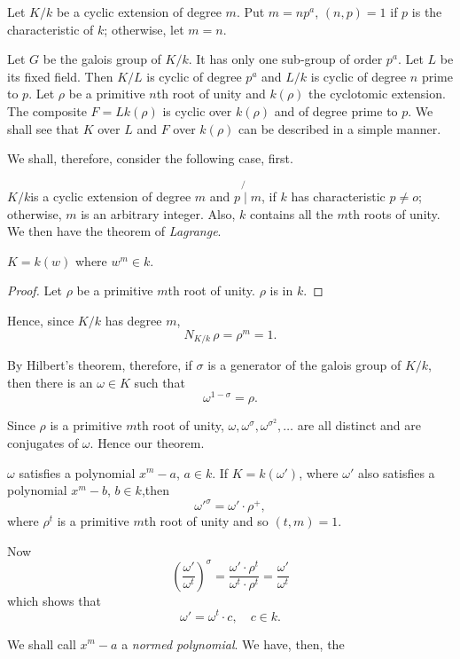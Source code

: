 Let $K/k$ be a cyclic extension of degree $m$. Put $m=n p^a$, $(n,p)=1$
if $p$ is the characteristic of $k$; otherwise, let $m=n$. 

Let $G$ be the galois group of $K/k$. It has only one sub-group of 
order $p^a$. Let $L$ be its fixed field. Then $K/L$ is cyclic of 
degree $p^a$ and $L/k$ is cyclic of degree $n$ prime to $p$. Let
$\rho$ be a primitive $n$th root of unity and $k(\rho)$ the cyclotomic
extension. The composite $F = Lk(\rho)$ is cyclic over $k(\rho)$ and
of degree prime to $p$. We shall see that $K$ over $L$ 
and $F$ over $k(\rho)$ can be described in a simple manner. 

We shall, therefore, consider the following case, first.

$K/k$\pageoriginale is a cyclic extension of degree $m$ and $p \not
{\mid}m$, if $k$ has characteristic $p \neq o$; otherwise, $m$ is an
arbitrary integer. Also, $k$ contains all the $m$th roots of unity. We
then have the theorem of \textit{Lagrange}.  

\begin{thm}\label{c6:thm9} %
$ K = k (w)$ where  $w^m \in k$.
\end{thm}

\begin{proof} %
Let $\rho$ be a primitive $m$th root of unity. $\rho$ is in $k$.
\end{proof}

Hence, since $K/k$ has degree $m$,
$$
N_{K/k} \, \rho = \rho^m =1.
$$

By Hilbert's theorem, therefore, if $\sigma$ is a generator of the
galois group of $K/k$, then there is an $\omega \in K$ such that 
$$
\omega^{1-\sigma}=\rho.
$$

Since $\rho$ is a primitive $m$th root of unity,
$\omega,\omega^\sigma,\omega^{\sigma^2},\ldots$ are all distinct and
are conjugates of $\omega$. Hence our theorem. 

$\omega$ satisfies a polynomial $x^m -a$, $a \in k$. If $K=k(\omega')$,
where $\omega'$ also satisfies a polynomial $x^m -b$, $b \in k$,then
$$
\omega'^\sigma =\omega' \cdot \rho^+,
$$
where $\rho^t$ is a primitive $m$th root of unity and so $(t,m)=1$.

\noindent
Now
$$
\left(\frac
     {\omega'}{\omega^t}\right)^\sigma = \frac{\omega'\cdot\rho^t}
     {\omega^t \cdot\rho^t} = \frac{\omega'}{\omega^t}
$$
which shows that
$$
\omega' = \omega^t \cdot  c, \quad  c \in k. 
$$

We shall call $x^m - a$ a \textit{normed polynomial}. We have, then, the


